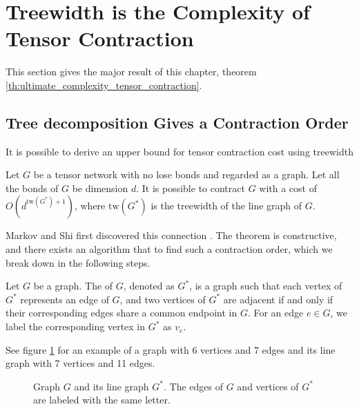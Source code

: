 \section{Treewidth is the Complexity of Tensor Contraction}

This section gives the major result of this chapter, theorem \ref{th:ultimate_complexity_tensor_contraction}.

\subsection{Tree decomposition Gives a Contraction Order}

It is possible to derive an upper bound for tensor contraction cost using treewidth

\begin{theorem}\label{thm:treewidth_tensor_contraction} 
	Let $G$ be a tensor network with no lose bonds and regarded as a graph. 
	Let all the bonds of $G$ be dimension $d$.
	It is possible to contract $G$ with a cost of $O(d^{\text{tw}(G^*) + 1})$, where $\text{tw}(G^*)$ is the treewidth of the line graph of $G$.
\end{theorem}

Markov and Shi first discovered this connection \cite{Markov_2008}.
The theorem is constructive, and there exists an algorithm that to find such a contraction order, which we break down in the following steps.

\begin{definition}
	Let $G$ be a graph. The  of $G$, denoted as $G^*$, is a graph such that each vertex of $G^*$ represents an edge of $G$, and two vertices of $G^*$ are adjacent if and only if their corresponding edges share a common endpoint in $G$.
	For an edge $e \in G$, we label the corresponding vertex in $G^*$ as $v_e$.
\end{definition}

\begin{example}
	See figure \ref{fig:line_graph_1} for an example of a graph with 6 vertices and 7 edges and its line graph with 7 vertices and 11 edges.
\end{example}

\begin{figure}[ht]
	\centering
	
	\caption{Graph $G$ and its line graph $G^*$. The edges of $G$ and vertices of $G^*$ are labeled with the same letter.}
	\label{fig:line_graph_1}
\end{figure}


